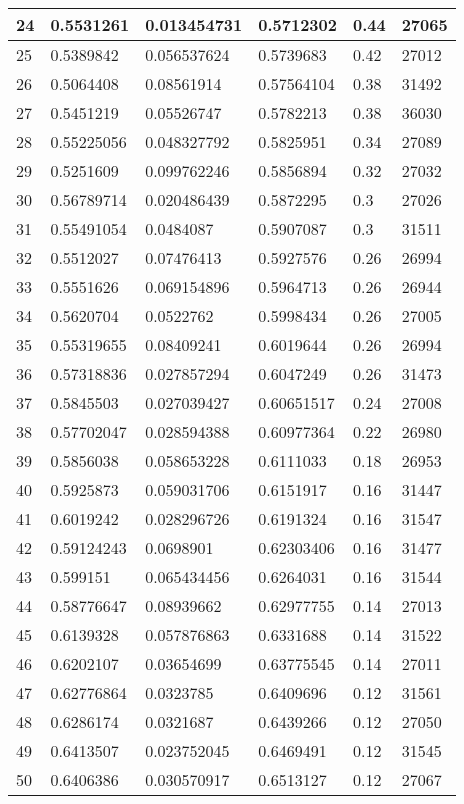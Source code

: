 \begin{longtable}{|l|l|l|l|l|l|}
24 & 0.5531261 & 0.013454731 & 0.5712302 & 0.44 & 27065 \\ \hline 
25 & 0.5389842 & 0.056537624 & 0.5739683 & 0.42 & 27012 \\ \hline 
26 & 0.5064408 & 0.08561914 & 0.57564104 & 0.38 & 31492 \\ \hline 
27 & 0.5451219 & 0.05526747 & 0.5782213 & 0.38 & 36030 \\ \hline 
28 & 0.55225056 & 0.048327792 & 0.5825951 & 0.34 & 27089 \\ \hline 
29 & 0.5251609 & 0.099762246 & 0.5856894 & 0.32 & 27032 \\ \hline 
30 & 0.56789714 & 0.020486439 & 0.5872295 & 0.3 & 27026 \\ \hline 
31 & 0.55491054 & 0.0484087 & 0.5907087 & 0.3 & 31511 \\ \hline 
32 & 0.5512027 & 0.07476413 & 0.5927576 & 0.26 & 26994 \\ \hline 
33 & 0.5551626 & 0.069154896 & 0.5964713 & 0.26 & 26944 \\ \hline 
34 & 0.5620704 & 0.0522762 & 0.5998434 & 0.26 & 27005 \\ \hline 
35 & 0.55319655 & 0.08409241 & 0.6019644 & 0.26 & 26994 \\ \hline 
36 & 0.57318836 & 0.027857294 & 0.6047249 & 0.26 & 31473 \\ \hline 
37 & 0.5845503 & 0.027039427 & 0.60651517 & 0.24 & 27008 \\ \hline 
38 & 0.57702047 & 0.028594388 & 0.60977364 & 0.22 & 26980 \\ \hline 
39 & 0.5856038 & 0.058653228 & 0.6111033 & 0.18 & 26953 \\ \hline 
40 & 0.5925873 & 0.059031706 & 0.6151917 & 0.16 & 31447 \\ \hline 
41 & 0.6019242 & 0.028296726 & 0.6191324 & 0.16 & 31547 \\ \hline 
42 & 0.59124243 & 0.0698901 & 0.62303406 & 0.16 & 31477 \\ \hline 
43 & 0.599151 & 0.065434456 & 0.6264031 & 0.16 & 31544 \\ \hline 
44 & 0.58776647 & 0.08939662 & 0.62977755 & 0.14 & 27013 \\ \hline 
45 & 0.6139328 & 0.057876863 & 0.6331688 & 0.14 & 31522 \\ \hline 
46 & 0.6202107 & 0.03654699 & 0.63775545 & 0.14 & 27011 \\ \hline 
47 & 0.62776864 & 0.0323785 & 0.6409696 & 0.12 & 31561 \\ \hline 
48 & 0.6286174 & 0.0321687 & 0.6439266 & 0.12 & 27050 \\ \hline 
49 & 0.6413507 & 0.023752045 & 0.6469491 & 0.12 & 31545 \\ \hline 
50 & 0.6406386 & 0.030570917 & 0.6513127 & 0.12 & 27067 \\ \hline 
\end{longtable}